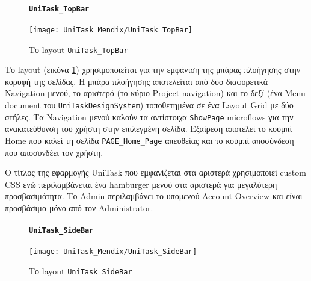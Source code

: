                 \begin{figure}[H] \noindent
                    \paragraph{\texttt{UniTask\_TopBar}}
                    \begin{center}
                        \texttt{[image: UniTask\_Mendix/UniTask\_TopBar]}
                        \caption{\centering Το layout \texttt{UniTask\_TopBar}}
                        \label{fig:unitask_UniTask_TopBar}
                    \end{center}
                \end{figure}

                Το layout (εικόνα \ref{fig:unitask_UniTask_TopBar}) χρησιμοποιείται για την εμφάνιση της μπάρας πλοήγησης στην κορυφή της σελίδας. Η μπάρα πλοήγησης αποτελείται από δύο διαφορετικά Navigation μενού, το αριστερό (το κύριο Project navigation) και το δεξί (ένα Menu document του \texttt{UniTaskDesignSystem}) τοποθετημένα σε ένα Layout Grid με δύο στήλες. Τα Navigation μενού καλούν τα αντίστοιχα \texttt{ShowPage} microflows για την ανακατεύθυνση του χρήστη στην επιλεγμένη σελίδα. Εξαίρεση αποτελεί το κουμπί {\Zona Home} που καλεί τη σελίδα \texttt{PAGE\_Home\_Page} απευθείας και το κουμπί {\Zonaa αποσύνδεση} που αποσυνδέει τον χρήστη.

                Ο τίτλος της εφαρμογής {\ZonaSB UniTask} που εμφανίζεται στα αριστερά χρησιμοποιεί custom CSS ενώ περιλαμβάνεται ένα hamburger μενού στα αριστερά για μεγαλύτερη προσβασιμότητα. Το {\Zone Admin} περιλαμβάνει το υπομενού {\Zona Account Overview} και είναι προσβάσιμα μόνο από τον Administrator.

                \begin{figure}[H] \noindent
                    \paragraph{\texttt{UniTask\_SideBar}}
                    \begin{center}
                        \texttt{[image: UniTask\_Mendix/UniTask\_SideBar]}
                        \caption{\centering Το layout \texttt{UniTask\_SideBar}}
                        \label{fig:unitask_UniTask_SideBar}
                    \end{center}
                \end{figure}\textbf{}


